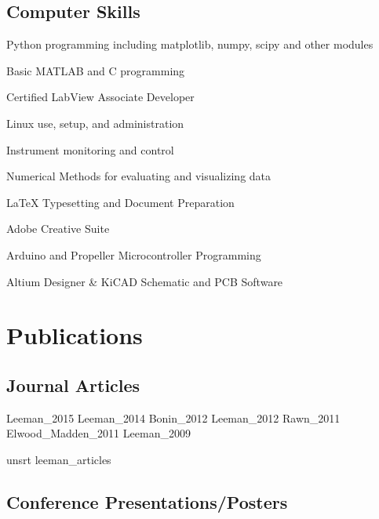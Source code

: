 \documentclass[letterpaper]{article}
\renewenvironment{itemize}{
  \begin{list}{}{
    \setlength{\leftmargin}{1.5em}
  }
}{
  \end{list}
}
\begin{document}
\subsection*{Computer Skills}

\begin{itemize}
\item Python programming including matplotlib, numpy, scipy and other modules
\item Basic MATLAB and C programming
\item Certified LabView Associate Developer 
\item Linux use, setup, and administration
\item Instrument monitoring and control
\item Numerical Methods for evaluating and visualizing data
\item \LaTeX{} Typesetting and Document Preparation
\item Adobe Creative Suite
\item Arduino and Propeller Microcontroller Programming
\item Altium Designer \& KiCAD Schematic and PCB Software
\end{itemize}



\section*{Publications}



\subsection*{Journal Articles}

\begingroup
\renewcommand{\section}[2]{}

\nocite{journal}{Leeman_2015}
\nocite{journal}{Leeman_2014}
\nocite{journal}{Bonin_2012}
\nocite{journal}{Leeman_2012}
\nocite{journal}{Rawn_2011}
\nocite{journal}{Elwood_Madden_2011}
\nocite{journal}{Leeman_2009}

{unsrt}
{leeman_articles}{}
\endgroup

\subsection*{Conference Presentations/Posters}
\end{document}
